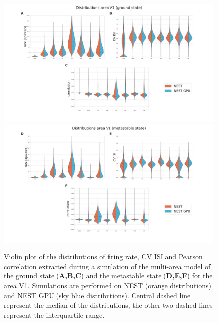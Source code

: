 \documentclass[a4paper, 12pt, twoside, openright]{book}
\begin{document}
\begin{figure}[H]
    \centering
    \includegraphics[trim=6cm 0 6cm 0, clip,width=\columnwidth]{figures/dist_violinplot_sample_gs.pdf}
    \includegraphics[trim=6cm 0 6cm 0, clip,width=\columnwidth]{figures/dist_violinplot_sample_ms.pdf}
    \caption{Violin plot of the distributions of firing rate, CV ISI and Pearson correlation extracted during a simulation of the multi-area model of the ground state (\textbf{A,B,C}) and the metastable state (\textbf{D,E,F}) for the area V1. Simulations are performed on NEST (orange distributions) and NEST GPU (sky blue distributions). Central dashed line represent the median of the distributions, the other two dashed lines represent the interquartile range.}
    \label{fig:mam_sample_dist}
\end{figure}
\end{document}
